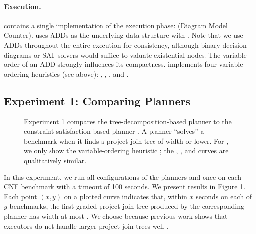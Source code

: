 \paragraph{Execution.} 
 contains a single implementation of the execution phase: \Dmc{} (Diagram Model Counter).
\Dmc{} uses ADDs as the underlying data structure with \cudd{} \cite{somenzi2015cudd}.
Note that we use ADDs throughout the entire execution for consistency, although binary decision diagrams \cite{bryant1986graph} or SAT solvers would suffice to valuate existential nodes.
The variable order of an ADD strongly influences its compactness.
\dmc{} implements four variable-ordering heuristics (see above): \mcs, \lexp, \lexm, and \minfill{}.



\subsection{Experiment 1: Comparing Planners}
\label{sec:procount:experiments:planners}
\begin{figure}[t]
    \centering
    
    \vspace*{-0.9cm}
    \caption{
        Experiment 1 compares the tree-decomposition-based planner \Lg{} to the constraint-satisfaction-based planner \htb{}.
	    A planner ``solves'' a benchmark when it finds a project-join tree of width \maxWidth{} or lower.
        For \htb, we only show the variable-ordering heuristic \mcs{}; the \lexp{}, \lexm{}, and \minfill{} curves are qualitatively similar.
    }
    \label{figPlanning}
\end{figure}

In this experiment, we run all configurations of the planners \Lg{} and \htb{} once on each CNF benchmark with a timeout of 100 seconds.
We present results in Figure \ref{figPlanning}.
Each point $(x, y)$ on a plotted curve indicates that, within $x$ seconds on each of $y$ benchmarks, the first graded project-join tree produced by the corresponding planner has width at most \maxWidth{}.
We choose \maxWidth{} because previous work shows that executors do not handle larger project-join trees well \cite{DDV19,dudek2020dpmc}.


